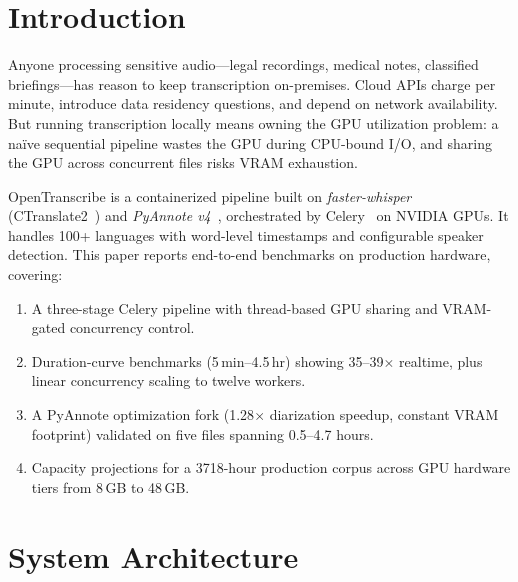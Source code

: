 \documentclass[conference,10pt]{IEEEtran}
\begin{document}
\section{Introduction}

Anyone processing sensitive audio---legal recordings, medical notes, classified
briefings---has reason to keep transcription on-premises. Cloud APIs charge per
minute, introduce data residency questions, and depend on network availability.
But running transcription locally means owning the GPU utilization problem:
a na\"ive sequential pipeline wastes the GPU during CPU-bound I/O, and sharing
the GPU across concurrent files risks VRAM exhaustion.

OpenTranscribe is a containerized pipeline built on
\textit{faster-whisper}~\cite{fasterwhisper2023}
(CTranslate2~\cite{ctranslate2_2023}) and
\textit{PyAnnote v4}~\cite{bredin2023pyannote21}, orchestrated by
Celery~\cite{celery2024} on NVIDIA GPUs.
It handles 100+ languages with word-level timestamps and configurable speaker
detection. This paper reports end-to-end benchmarks on production hardware,
covering:
\begin{enumerate}[nosep,leftmargin=*]
  \item A three-stage Celery pipeline with thread-based GPU sharing and
        VRAM-gated concurrency control.
  \item Duration-curve benchmarks (5\,min--4.5\,hr) showing 35--39$\times$
        realtime, plus linear concurrency scaling to twelve workers.
  \item A PyAnnote optimization fork (1.28$\times$ diarization speedup,
        constant VRAM footprint) validated on five files spanning 0.5--4.7
        hours.
  \item Capacity projections for a \num{3718}-hour production corpus across
        GPU hardware tiers from 8\,GB to 48\,GB.
\end{enumerate}

\section{System Architecture}
\end{document}

